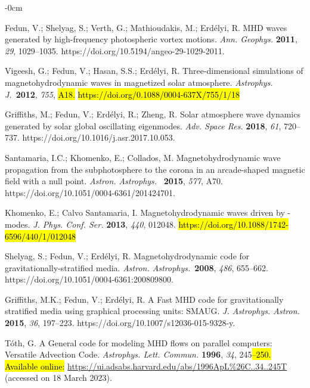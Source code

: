 \documentclass[physics,article,accept,pdftex,moreauthors]{Definitions/mdpi}
\newcommand{\aap}{{\it Astron. Astrophys.}}
\newcommand{\apj}{{\it Astrophys. J.}}
\begin{document}
\begin{adjustwidth}{-\extralength}{0cm}
\begin{thebibliography}{999}
		Fedun, V.; Shelyag, S.; Verth, G.; Mathioudakis, M.; Erd\'elyi, R. MHD waves generated by high-frequency photospheric vortex 
motions. \emph{Ann. Geophys.} \textbf{2011}, \emph{29}, 1029--1035. https://doi.org/10.5194/angeo-29-1029-2011.
		
		{Vigeesh}, G.; {Fedun}, V.; {Hasan}, S.S.; {Erd{\'e}lyi}, R. {Three-dimensional simulations of magnetohydrodynamic waves in 
magnetized solar atmosphere}. \apj~\textbf{2012}, \emph{755}, \hl{A18.} %
 \hl{https://doi.org/0.1088/0004-637X/755/1/18} 
		
		Griffiths, M.; Fedun, V.; Erd\'elyi, R.; Zheng, R. Solar atmosphere wave dynamics generated by solar global oscillating eigenmodes. 
\emph{Adv. Space Res.} \textbf{2018}, \emph{61}, 720--737. https://doi.org/10.1016/j.asr.2017.10.053.
		
		Santamaria, I.C.; Khomenko, E.; Collados, M. Magnetohydrodynamic wave propagation from the subphotosphere to the corona in an arcade-shaped magnetic field with a null point. \aap~ \textbf{2015}, \emph{577}, A70. https://doi.org/10.1051/0004-6361/201424701.

		{Khomenko}, E.; {Calvo Santamaria}, I. {Magnetohydrodynamic waves driven
			by -modes}. \emph{J. Phys. Conf. Ser.} \textbf{2013}, \emph{440}, 012048.
 \hl{https://doi.org/10.1088/1742-6596/440/1/012048} 		
		
		Shelyag, S.; Fedun, V.; Erd\'elyi, R. Magnetohydrodynamic code for gravitationally-stratified media. \aap~\textbf{2008}, \emph{486}, 
655--662. https://doi.org/10.1051/0004-6361:200809800.
		
		Griffiths, M.K.; Fedun, V.; Erd\'elyi, R. A Fast MHD code for gravitationally stratified media using graphical processing units: 
SMAUG. \emph{J. Astrophys. Astron.} \textbf{2015}, \emph{36}, 197--223. https://doi.org/10.1007/s12036-015-9328-y.
		
		{T{\'o}th}, G. {A General code for modeling {MHD} flows on parallel
			computers: Versatile Advection Code}. \emph{Astrophys. Lett. Commun.} \textbf{1996}, \emph{34}, 245\hl{--250.}
 \hl{Available online:} \url{https://ui.adsabs.harvard.edu/abs/1996ApL%26C..34..245T} (accessed on 18 March 2023). 
		

\end{thebibliography}
\end{adjustwidth}
\end{document}
